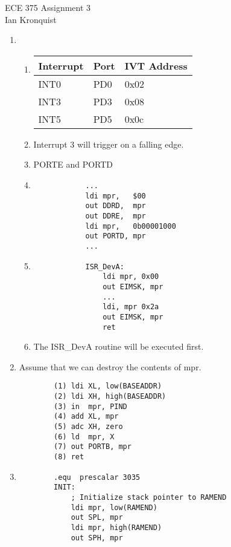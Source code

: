 \documentclass[12pt,letterpaper]{article}
\begin{document}
\begin{flushright}
{\large
ECE 375 Assignment 3\\
Ian Kronquist
}
\end{flushright}

\bigskip

\begin{enumerate}
    \item
    \begin{enumerate}
        \item
        \begin{tabular}{l l l}
             Interrupt & Port & IVT Address \\
             \hline
             INT0 & PD0 & 0x02 \\
             INT3 & PD3 & 0x08 \\
             INT5 & PD5 & 0x0c \\
        \end{tabular}
        \item Interrupt 3 will trigger on a falling edge.\\
        \item PORTE and PORTD \\
        \item \begin{verbatim}
            ...
            ldi mpr,   $00
            out DDRD,  mpr
            out DDRE,  mpr
            ldi mpr,   0b00001000
            out PORTD, mpr
            ...
        \end{verbatim}
        \item \begin{verbatim}
            ISR_DevA:
                ldi mpr, 0x00
                out EIMSK, mpr
                ...
                ldi, mpr 0x2a
                out EIMSK, mpr
                ret
        \end{verbatim}
        \item The ISR\_DevA routine will be executed first.\\
    \end{enumerate}
    \item Assume that we can destroy the contents of mpr.
    \begin{verbatim}
        (1) ldi XL, low(BASEADDR)
        (2) ldi XH, high(BASEADDR)
        (3) in  mpr, PIND
        (4) add XL, mpr
        (5) adc XH, zero
        (6) ld  mpr, X
        (7) out PORTB, mpr
        (8) ret
    \end{verbatim}
    \item \begin{verbatim}
        .equ  prescalar 3035
        INIT:
            ; Initialize stack pointer to RAMEND
            ldi mpr, low(RAMEND)
            out SPL, mpr
            ldi mpr, high(RAMEND)
            out SPH, mpr


\end{verbatim}
\end{enumerate}
\end{document}
